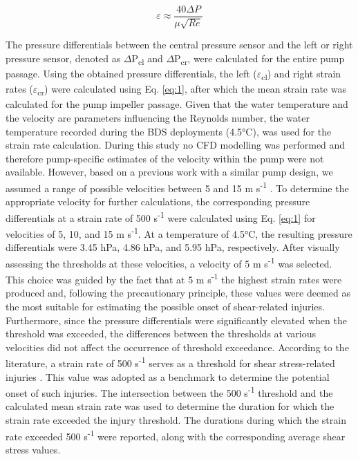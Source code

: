 \documentclass[fleqn,10pt]{wlscirep}
\begin{document}
\begin{equation} \label{eq:1}
\varepsilon \approx \frac{40 \Delta P}{\mu \sqrt{Re}}
\end{equation}

The pressure differentials between the central pressure sensor and the left or right pressure sensor, denoted as $\Delta$P\textsubscript{cl} and $\Delta$P\textsubscript{cr}, were calculated for the entire pump passage. Using the obtained pressure differentials, the left ($\varepsilon$\textsubscript{cl}) and right strain rates ($\varepsilon$\textsubscript{cr}) were calculated using Eq. \ref{eq:1}, after which the mean strain rate was calculated for the pump impeller passage. Given that the water temperature and the velocity are parameters influencing the Reynolds number, the water temperature recorded during the BDS deployments (4.5°C), was used for the strain rate calculation. During this study no CFD modelling was performed and therefore pump-specific estimates of the velocity within the pump were not available. However, based on a previous work with a similar pump design, we assumed a range of possible velocities between 5 and 15 m s\textsuperscript{-1} \cite{Pan2020Fish-friendlyModel}. To determine the appropriate velocity for further calculations, the corresponding pressure differentials at a strain rate of 500 s\textsuperscript{-1} were calculated using Eq. \ref{eq:1} for velocities of 5, 10, and 15 m s\textsuperscript{-1}. At a temperature of 4.5°C, the resulting pressure differentials were 3.45 hPa, 4.86 hPa, and 5.95 hPa, respectively. After visually assessing the thresholds at these velocities, a velocity of 5 m s\textsuperscript{-1} was selected. This choice was guided by the fact that at  5 m s\textsuperscript{-1} the highest strain rates were produced and, following the precautionary principle, these values were deemed as the most suitable for estimating the possible onset of shear-related injuries. Furthermore, since the pressure differentials were significantly elevated when the threshold was exceeded, the differences between the thresholds at various velocities did not affect the occurrence of threshold exceedance. According to the literature, a strain rate of 500 s\textsuperscript{-1} serves as a threshold for shear stress-related injuries \cite{Neitzel2000LaboratoryFish}. This value was adopted as a benchmark to determine the potential onset of such injuries. The intersection between the 500 s\textsuperscript{-1} threshold and the calculated mean strain rate was used to determine the duration for which the strain rate exceeded the injury threshold. The durations during which the strain rate exceeded 500 s\textsuperscript{-1} were reported, along with the corresponding average shear stress values.
\end{document}
